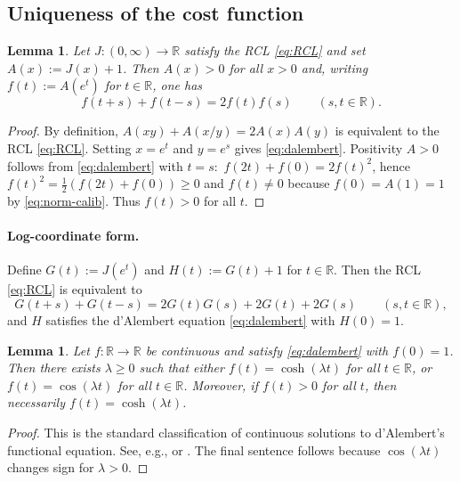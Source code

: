 \documentclass[11pt,reqno]{amsart}
\theoremstyle{plain}
\newtheorem{lemma}[theorem]{Lemma}
\theoremstyle{definition}
\theoremstyle{remark}
\newcommand{\Jcost}{J}
\newcommand{\RR}{\mathbb{R}}
\newcommand{\1}{\mathbf{1}}
\begin{document}
\subsection{Uniqueness of the cost function}

\begin{lemma}\label{lem:dalembert-reduction}
Let $\Jcost:(0,\infty)\to\RR$ satisfy the RCL \eqref{eq:RCL} and set $A(x):=\Jcost(x)+1$.
Then $A(x)>0$ for all $x>0$ and, writing $f(t):=A(e^t)$ for $t\in\RR$, one has
\begin{equation}\label{eq:dalembert}
f(t+s)+f(t-s)=2f(t)f(s)\qquad (s,t\in\RR).
\end{equation}
\end{lemma}

\begin{proof}
By definition, $A(xy)+A(x/y)=2A(x)A(y)$ is equivalent to the RCL \eqref{eq:RCL}.
Setting $x=e^t$ and $y=e^s$ gives \eqref{eq:dalembert}.
Positivity $A>0$ follows from \eqref{eq:dalembert} with $t=s$:
$\,f(2t)+f(0)=2f(t)^2$, hence $f(t)^2=\tfrac12(f(2t)+f(0))\ge 0$ and $f(t)\neq 0$
because $f(0)=A(1)=1$ by \eqref{eq:norm-calib}. Thus $f(t)>0$ for all $t$.
\end{proof}

\paragraph{Log-coordinate form.}
Define $G(t):=\Jcost(e^t)$ and $H(t):=G(t)+1$ for $t\in\RR$.
Then the RCL \eqref{eq:RCL} is equivalent to
\begin{equation}\label{eq:Gcosh}
G(t+s)+G(t-s)=2G(t)G(s)+2G(t)+2G(s)\qquad (s,t\in\RR),
\end{equation}
and $H$ satisfies the d'Alembert equation \eqref{eq:dalembert} with $H(0)=1$.


\begin{lemma}\label{lem:dalembert-classification}
Let $f:\RR\to\RR$ be continuous and satisfy \eqref{eq:dalembert} with $f(0)=1$.
Then there exists $\lambda\ge 0$ such that either $f(t)=\cosh(\lambda t)$ for all $t\in\RR$,
or $f(t)=\cos(\lambda t)$ for all $t\in\RR$.
Moreover, if $f(t)>0$ for all $t$, then necessarily $f(t)=\cosh(\lambda t)$.
\end{lemma}

\begin{proof}
This is the standard classification of continuous solutions to d'Alembert's functional equation.
See, e.g., \cite[Ch.~2]{aczel_dhombres1989} or \cite[\S13]{Kuczma}. The final sentence follows
because $\cos(\lambda t)$ changes sign for $\lambda>0$.
\end{proof}
\end{document}
